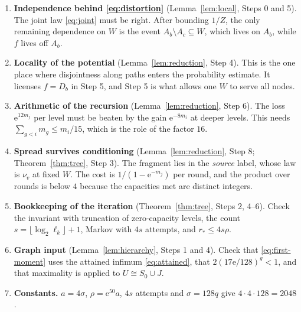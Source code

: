 \documentclass[11pt]{article}
\numberwithin{equation}{section}
\newcommand{\ee}{\mathrm e}
\begin{document}
\begin{enumerate}[leftmargin=2em,itemsep=2pt]
\item \textbf{Independence behind \eqref{eq:distortion}}
(Lemma~\ref{lem:local}, Steps 0 and 5). The joint law \eqref{eq:joint} must be
right. After bounding $1/Z$, the only remaining dependence on $W$ is the event
$A_b\setminus A_c\subseteq W$, which lives on $A_b$, while $f$ lives off $A_b$.
\item \textbf{Locality of the potential} (Lemma~\ref{lem:reduction}, Step 4).
This is the one place where disjointness along paths enters the probability
estimate. It licenses $f=D_b$ in Step 5, and Step 5 is what allows one $W$ to
serve all nodes.
\item \textbf{Arithmetic of the recursion} (Lemma~\ref{lem:reduction}, Step 6).
The loss $\ee^{12m_j}$ per level must be beaten by the gain $\ee^{-8m_i}$ at
deeper levels. This needs $\sum_{g<i}m_g\le m_i/15$, which is the role of the
factor $16$.
\item \textbf{Spread survives conditioning} (Lemma~\ref{lem:reduction}, Step 8;
Theorem~\ref{thm:tree}, Step 3). The fragment lies in the \emph{source} label,
whose law is $\nu_v$ at fixed $W$. The cost is $1/(1-\ee^{-m_j})$ per round, and
the product over rounds is below $4$ because the capacities met are distinct
integers.
\item \textbf{Bookkeeping of the iteration} (Theorem~\ref{thm:tree}, Steps 2,
4--6). Check the invariant with truncation of zero-capacity levels, the count
$s=\lfloor\log_2\ell_k\rfloor+1$, Markov with $4s$ attempts, and
$r_*\le4s\rho$.
\item \textbf{Graph input} (Lemma~\ref{lem:hierarchy}, Steps 1 and 4). Check
that \eqref{eq:first-moment} uses the attained infimum \eqref{eq:attained},
that $2(17\ee/128)^g<1$, and that maximality is applied to $U\cong S_0\cup J$.
\item \textbf{Constants.} $a=4\sigma$, $\rho=\ee^{50}a$, $4s$ attempts and
$\sigma=128q$ give $4\cdot4\cdot128=2048$.
\end{enumerate}
\end{document}
